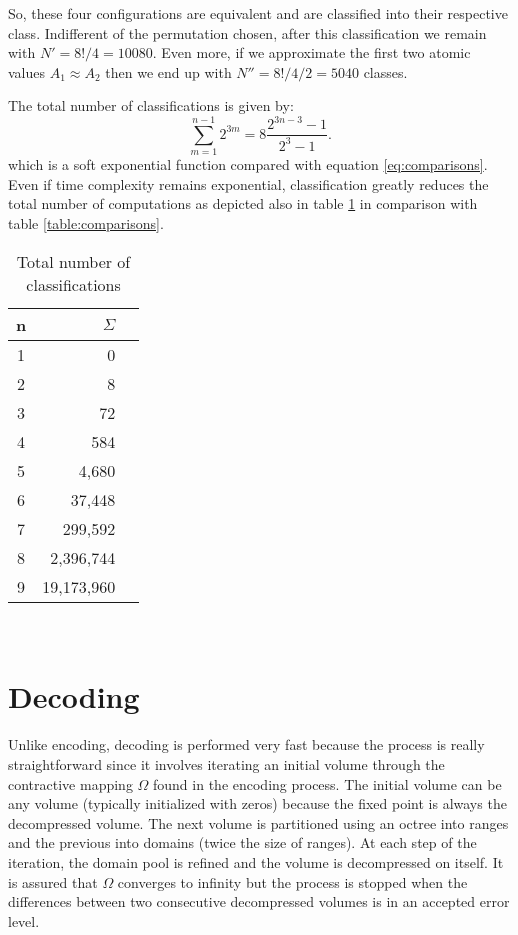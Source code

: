 \documentclass[10pt, conference, compsocconf]{IEEEtran}
\begin{document}
So, these four configurations are equivalent and are classified into their respective class. Indifferent of the permutation chosen, after this classification we remain with $N'=8!/4=10080$. Even more, if we approximate the first two atomic values $A_1 \approx A_2$ then we end up with $N''=8!/4/2=5040$ classes.

The total number of classifications is given by:
\begin{equation}
\sum_{m=1}^{n-1} 2^{3m} = 8\frac{2^{3n-3}-1}{2^3-1}.
\end{equation}
which is a soft exponential function compared with equation \ref{eq:comparisons}. Even if time complexity remains exponential, classification greatly reduces the total number of computations as depicted also in table \ref{table:classifications} in comparison with table \ref{table:comparisons}.

\begin{table}[!t]
\renewcommand{\tablename}{TABLE}
\caption{Total number of classifications}
\centering
\begin{tabular}{c rc}
\hline\hline
n & $\Sigma$ \\ [0.5ex]
\hline
1 & 0\\
2 & 8\\
3 & 72\\
4 & 584\\
5 & 4,680\\
6 & 37,448\\
7 & 299,592\\
8 & 2,396,744\\
9 & 19,173,960\\
\hline
\end{tabular}
\label{table:classifications}
\end{table}

~\\
\section{Decoding}
Unlike encoding, decoding is performed very fast \cite{Bah93} because the process is really straightforward since it involves iterating an initial volume through the contractive mapping $\Omega$ found in the encoding process. The initial volume can be any volume (typically initialized with zeros) because the fixed point is always the decompressed volume. The next volume is partitioned using an octree into ranges and the previous into domains (twice the size of ranges). At each step of the iteration, the domain pool is refined and the volume is decompressed on itself. It is assured that $\Omega$ converges to infinity but the process is stopped when the differences between two consecutive decompressed volumes is in an accepted error level.
\end{document}
